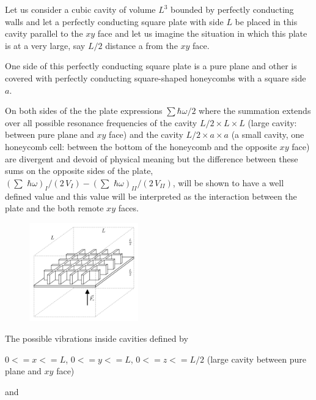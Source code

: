 \documentclass[twoside, 10pt]{article}
\begin{document}
\begin{multicols}{2}

    Let us consider a cubic cavity of volume \(L^3\) bounded by perfectly
conducting walls and let a perfectly conducting square plate with side
\(L\) be placed in this cavity parallel to the \(xy\) face and let us
imagine the situation in which this plate is at a very large, say
\(L/2\) distance a from the \(xy\) face.


One side of this perfectly conducting square plate is a pure plane and
other is covered with perfectly conducting square-shaped honeycombs with
a square side \(a\).

On both sides of the the plate expressions \(\sum\hbar\omega\big/2\)
where the summation extends over all possible resonance frequencies of
the cavity \(L/2 \times L \times L\) (large cavity: between pure plane
and \(xy\) face) and the cavity \(L/2 \times a\times a\) (a small
cavity, one honeycomb cell: between the bottom of the honeycomb and the
opposite \(xy\) face) are divergent and devoid of physical meaning but
the difference between these sums on the opposite sides of the plate,
\(\left(\sum\,\,\hbar\omega\right)_{I}\big/{\left(2\,V_{I}\right)} - \left(\sum\,\,\hbar\omega\right)_{II}\big/{\left(2\,V_{II}\right)}\),
will be shown to have a well defined value and this value will be
interpreted as the interaction between the plate and the both remote
\(xy\) faces.

\begin{figure}
\includegraphics[width=0.42\textwidth]{honeycomb_box_L.png}
\caption{}{}
\label{fig:honeycomb_box_L}
\end{figure}


    The possible vibrations inside cavities defined by

    \(0<=x<=L\), \(0<=y<=L\), \(0<=z<=L/2\) (large cavity between pure
plane and \(xy\) face)

    and


\end{multicols}
\end{document}
